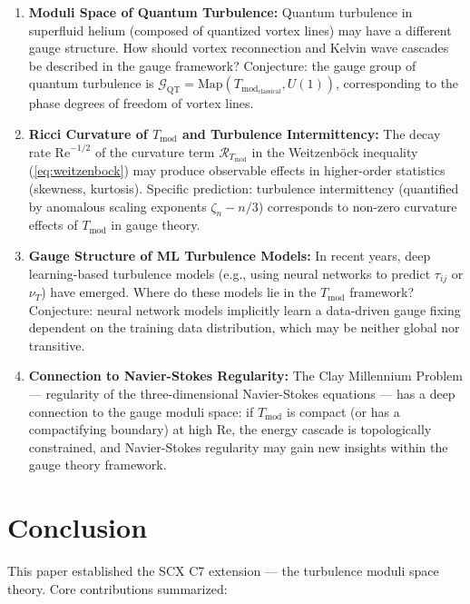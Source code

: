 \documentclass[12pt,a4paper]{article}
\theoremstyle{plain}
\theoremstyle{definition}
\theoremstyle{remark}
\newcommand{\G}{\mathcal{G}}
\newcommand{\Tmod}{T_{\text{mod}}}
\newcommand{\ReNum}{\mathrm{Re}}
\begin{document}
\begin{enumerate}[label=\textbf{OP\arabic*}.]
    \item \textbf{Moduli Space of Quantum Turbulence:} Quantum turbulence in superfluid helium (composed of quantized vortex lines) may have a different gauge structure. How should vortex reconnection and Kelvin wave cascades be described in the gauge framework? Conjecture: the gauge group of quantum turbulence is $\G_{\text{QT}} = \text{Map}(\Tmod_{\text{classical}}, U(1))$, corresponding to the phase degrees of freedom of vortex lines.

    \item \textbf{Ricci Curvature of $\Tmod$ and Turbulence Intermittency:} The decay rate $\ReNum^{-1/2}$ of the curvature term $\mathcal{R}_{\Tmod}$ in the Weitzenb\"ock inequality (\ref{eq:weitzenbock}) may produce observable effects in higher-order statistics (skewness, kurtosis). Specific prediction: turbulence intermittency (quantified by anomalous scaling exponents $\zeta_n - n/3$) corresponds to non-zero curvature effects of $\Tmod$ in gauge theory.

    \item \textbf{Gauge Structure of ML Turbulence Models:} In recent years, deep learning-based turbulence models (e.g., using neural networks to predict $\tau_{ij}$ or $\nu_T$) have emerged. Where do these models lie in the $\Tmod$ framework? Conjecture: neural network models implicitly learn a data-driven gauge fixing dependent on the training data distribution, which may be neither global nor transitive.

    \item \textbf{Connection to Navier-Stokes Regularity:} The Clay Millennium Problem --- regularity of the three-dimensional Navier-Stokes equations --- has a deep connection to the gauge moduli space: if $\Tmod$ is compact (or has a compactifying boundary) at high Re, the energy cascade is topologically constrained, and Navier-Stokes regularity may gain new insights within the gauge theory framework.
\end{enumerate}

\section{Conclusion}

This paper established the SCX C7 extension --- the turbulence moduli space theory. Core contributions summarized:
\end{document}
